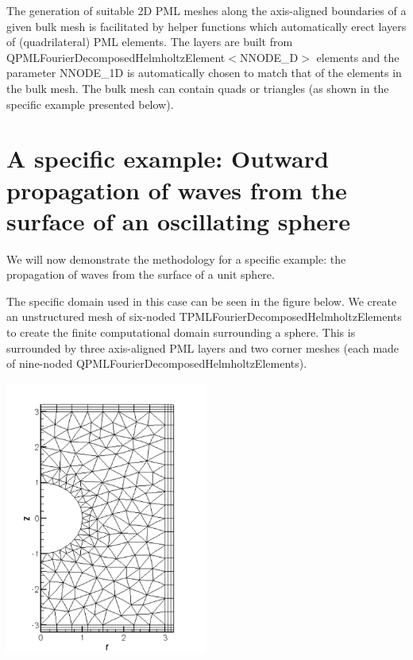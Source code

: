 The generation of suitable 2D P\+ML meshes along the axis-\/aligned boundaries of a given bulk mesh is facilitated by helper functions which automatically erect layers of (quadrilateral) P\+ML elements. The layers are built from {\ttfamily Q\+P\+M\+L\+Fourier\+Decomposed\+Helmholtz\+Element$<$\+N\+N\+O\+D\+E\+\_\+D$>$} elements and the parameter {\ttfamily N\+N\+O\+D\+E\+\_\+1D} is automatically chosen to match that of the elements in the bulk mesh. The bulk mesh can contain quads or triangles (as shown in the specific example presented below).



\hypertarget{index_osc_sph}{}\section{A specific example\+: Outward propagation of waves from the surface of an oscillating sphere}\label{index_osc_sph}
We will now demonstrate the methodology for a specific example\+: the propagation of waves from the surface of a unit sphere.

The specific domain used in this case can be seen in the figure below. We create an unstructured mesh of six-\/noded {\ttfamily T\+P\+M\+L\+Fourier\+Decomposed\+Helmholtz\+Elements} to create the finite computational domain surrounding a sphere. This is surrounded by three axis-\/aligned P\+ML layers and two corner meshes (each made of nine-\/noded {\ttfamily Q\+P\+M\+L\+Fourier\+Decomposed\+Helmholtz\+Elements}).

 
\begin{DoxyImage}
\includegraphics[width=0.5\textwidth]{comp_domain}
\end{DoxyImage}


